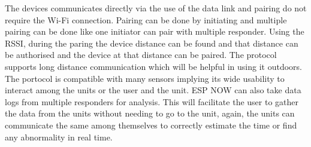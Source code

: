 The devices communicates directly via the use of the data link and pairing do not require the Wi-Fi connection. Pairing can be done by initiating and multiple pairing can be done like one initiator can pair with multiple responder. Using the RSSI, during the paring the device distance can be found and that distance can be authorised and the device at that distance can be paired. The protocol supports long distance communication which will be helpful in using it outdoors. The portocol is compatible with many sensors implying its wide usability to interact among the units or the user and the unit. ESP NOW can also take data logs from multiple responders for analysis. This will facilitate the user to gather the data from the units without needing to go to the unit, again, the units can communicate the same among themselves to correctly estimate the time or find any abnormality in real time. 
